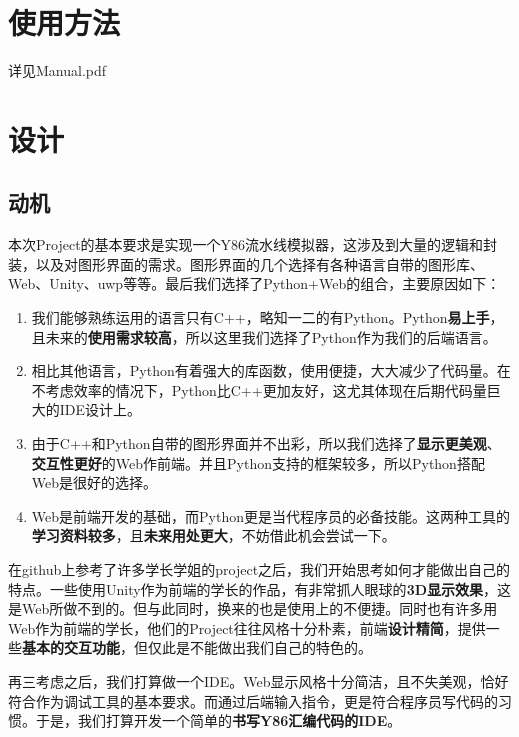 \documentclass[a4paper,11pt,UTF8]{ctexart}
\begin{document}
\begin{sloppypar}
\section{使用方法}
详见Manual.pdf

\clearpage
\section{设计}

\subsection{{\bf 动机}}

本次Project的基本要求是实现一个Y86流水线模拟器，这涉及到大量的逻辑和封装，以及对图形界面的需求。图形界面的几个选择有各种语言自带的图形库、Web、Unity、uwp等等。最后我们选择了Python+Web的组合，主要原因如下：

\begin{enumerate}
\item 我们能够熟练运用的语言只有C++，略知一二的有Python。Python{\bf 易上手}，且未来的{\bf 使用需求较高}，所以这里我们选择了Python作为我们的后端语言。

\item 相比其他语言，Python有着强大的库函数，使用便捷，大大减少了代码量。在不考虑效率的情况下，Python比C++更加友好，这尤其体现在后期代码量巨大的IDE设计上。

\item 由于C++和Python自带的图形界面并不出彩，所以我们选择了{\bf 显示更美观}、{\bf 交互性更好}的Web作前端。并且Python支持的框架较多，所以Python搭配Web是很好的选择。

\item Web是前端开发的基础，而Python更是当代程序员的必备技能。这两种工具的{\bf 学习资料较多}，且{\bf 未来用处更大}，不妨借此机会尝试一下。
\end{enumerate}

在github上参考了许多学长学姐的project之后，我们开始思考如何才能做出自己的特点。一些使用Unity作为前端的学长的作品，有非常抓人眼球的{\bf 3D显示效果}，这是Web所做不到的。但与此同时，换来的也是使用上的不便捷。同时也有许多用Web作为前端的学长，他们的Project往往风格十分朴素，前端{\bf 设计精简}，提供一些{\bf 基本的交互功能}，但仅此是不能做出我们自己的特色的。

再三考虑之后，我们打算做一个IDE。Web显示风格十分简洁，且不失美观，恰好符合作为调试工具的基本要求。而通过后端输入指令，更是符合程序员写代码的习惯。于是，我们打算开发一个简单的{\bf 书写Y86汇编代码的IDE}。


\end{sloppypar}
\end{document}
